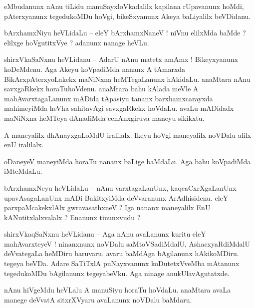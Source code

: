\documentclass{article}
\begin{document}
\begin{mn}%
eMbudanunx nAnu tiLidu manuSayxloVkadalilx kapilana rUpavanunx hoMdi, pAterxyanunx tegedukoMDu 
hoVgi, bikeSxyanunx Akeya baLiyalilx beVDidanu.
\end{mn}

\begin{mn}%
bArxhamxNiyu heVLidaLu -- eleY bArxhamxNaneV ! niVnu elilxMda baMde ? elilxge hoVgutitxVye ? 
adanunx nanage heVLu.
\end{mn}

\begin{mn}%
shirxVkaSaNxnu heVLidanu -- AdarU nAnu matetx amAmx ! Bikeyxyanunx koDeMdenu. Aga Akeyu koVpadiMda 
nananx A tAmarxda BikArxpAterxyoLakekx maNiNxna heMTegaLanunx hAkidaLu. anaMtara nAnu savxgaRkekx 
horaTuhoVdenu. anaMtara bahu kAlada meVle A mahAvarxtagaLanunx mADida tApasiyu tananx 
barxhamxcarayxda mahimeyiMda heVha sahitavAgi savxgaRkekx hoVdaLu. avaLu mADidadx maNiNxna heMTeya 
dAnadiMda cenAnxgiruva maneyu sikikxtu.
\end{mn}

\begin{mn}%
A maneyalilx dhAnayxgaLoMdU iralilalx. Ikeyu hoVgi maneyalilx noVDalu alilx enU iralilalx.
\end{mn}

\begin{mn}%
oDaneyeV maneyiMda horaTu nananx baLige baMdaLu. Aga bahu koVpadiMda iMteMdaLu.
\end{mn}

\begin{mn}%
bArxhamxNeyu heVLidaLu -- nAnu varxtagaLanUnx, kaqcaCxrXgaLanUnx upavAsagaLanUnx mADi BakitxyiMda 
deVvaranunx ArAdhisidenu. eleY parxpaMcakekxlAlx gwravasathxneV ? Iga nananx maneyalilx EnU 
kANutitxlalxvalalx ? Enanunx tinunxvudu ?
\end{mn}

\begin{mn}%
shirxVkaqSaNxnu heVLidanu -- Aga nAnu avaLanunx kuritu eleY mahAvarxteyeV ! ninanxnunx noVDalu 
saMtoVSadiMdalU, AshacxyaRdiMdalU deVvategaLa heMDiru baruvaru. avaru baMdAga bAgilanunx 
hAkikoMDiru. tegeya beVDa. Adare SaTiTxlA puNayxvanunx koDutetxVveMba mAtanunx tegedukoMDu 
bAgilanunx tegeyabeVku. Aga ninage anukUlavAgutatxde.
\end{mn}

\begin{mn}%
nAnu hiVgeMdu heVLalu A manuSiyu horaTu hoVdaLu. anaMtara avaLa manege deVvatA sitxrXVyaru 
avaLanunx noVDalu baMdaru.
\end{mn}
\end{document}
